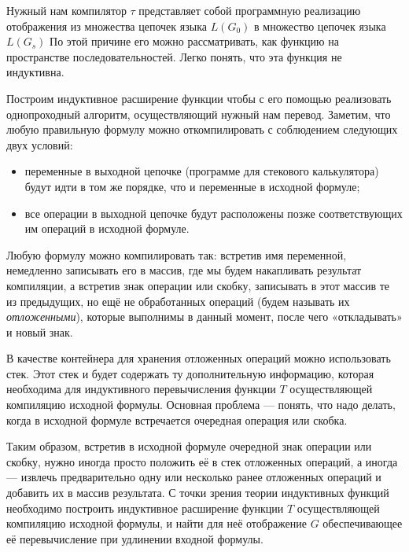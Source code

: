 Нужный нам компилятор $\tau$ представляет собой программную реализацию отображения из
множества цепочек языка $L(G_0)$ в множество цепочек языка $L(G_s)$ По этой причине его можно
рассматривать, как функцию на пространстве последовательностей. Легко понять,
что эта функция не индуктивна.

Построим индуктивное расширение  функции  чтобы с его помощью реализовать
однопроходный алгоритм, осуществляющий нужный нам перевод. Заметим, что любую
правильную формулу можно откомпилировать с соблюдением следующих двух условий:
\begin{itemize}
\item переменные в выходной цепочке (программе для стекового калькулятора) будут идти
в том же порядке, что и переменные в исходной формуле;
\item все операции в выходной цепочке будут расположены позже соответствующих им
операций в исходной формуле.
\end{itemize}

Любую формулу можно компилировать так: встретив имя переменной, немедленно
записывать его в массив, где мы будем накапливать результат компиляции, а
встретив знак операции или скобку, записывать в этот массив те из предыдущих,
но ещё не обработанных операций (будем называть их \emph{отложенными}), которые
выполнимы в данный момент, после чего «откладывать» и новый знак.

В качестве контейнера для хранения отложенных операций можно использовать стек.
Этот стек и будет содержать ту дополнительную информацию, которая необходима для
индуктивного перевычисления функции $T$ осуществляющей компиляцию исходной формулы.
Основная проблема — понять, что надо делать, когда в исходной формуле встречается
очередная операция или скобка.

Таким образом, встретив в исходной формуле очередной знак операции или скобку,
нужно иногда просто положить её в стек отложенных операций, а иногда — извлечь
предварительно одну или несколько ранее отложенных операций и добавить их в
массив результата. С точки зрения теории индуктивных функций необходимо построить
индуктивное расширение функции $T$ осуществляющей компиляцию исходной формулы, и
найти для неё отображение $G$ обеспечивающее её перевычисление при удлинении входной формулы.

